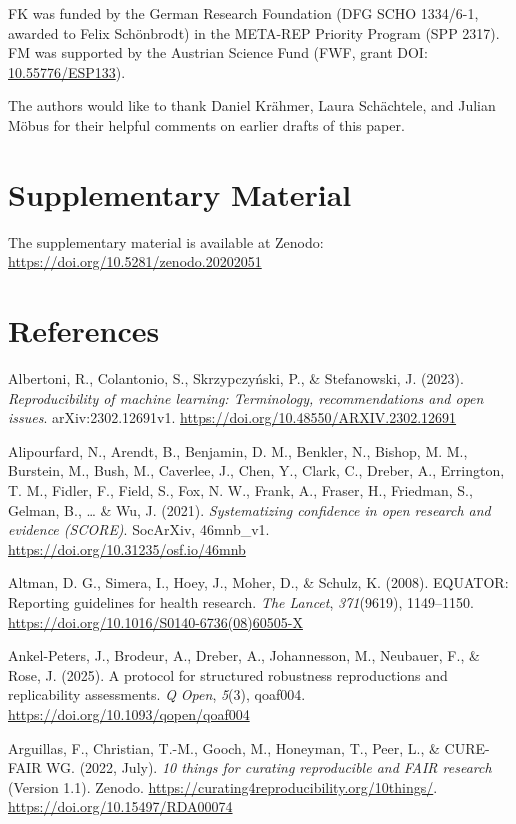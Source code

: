 \documentclass[authordate, meta]{jote-new-article}
\begin{document}
	FK was funded by the German Research Foundation (DFG SCHO 1334/6-1, awarded to Felix Schönbrodt) in the META-REP Priority Program (SPP 2317). FM was supported by the Austrian Science Fund (FWF, grant DOI: \href{https://doi.org/10.55776/ESP133}{10.55776/ESP133}).




	The authors would like to thank Daniel Krähmer, Laura Schächtele, and Julian Möbus for their helpful comments on earlier drafts of this paper.




	\section{Supplementary Material}



	The supplementary material is available at Zenodo: \url{https://doi.org/10.5281/zenodo.20202051}

	\section{References}

	Albertoni, R., Colantonio, S., Skrzypczyński, P., \& Stefanowski, J. (2023). \emph{Reproducibility of machine learning: Terminology, recommendations and open issues}. arXiv:2302.12691v1. \url{https://doi.org/10.48550/ARXIV.2302.12691}


	Alipourfard, N., Arendt, B., Benjamin, D. M., Benkler, N., Bishop, M. M., Burstein, M., Bush, M., Caverlee, J., Chen, Y., Clark, C., Dreber, A., Errington, T. M., Fidler, F., Field, S., Fox, N. W., Frank, A., Fraser, H., Friedman, S., Gelman, B., … \& Wu, J. (2021). \emph{Systematizing confidence in open research and evidence (SCORE)}. SocArXiv, 46mnb\_v1. \url{https://doi.org/10.31235/osf.io/46mnb}


	Altman, D. G., Simera, I., Hoey, J., Moher, D., \& Schulz, K. (2008). EQUATOR: Reporting guidelines for health research. \emph{The Lancet}, \emph{371}(9619), 1149--1150. \url{https://doi.org/10.1016/S0140-6736(08)60505-X}



	Ankel-Peters, J., Brodeur, A., Dreber, A., Johannesson, M., Neubauer, F., \& Rose, J. (2025). A protocol for structured robustness reproductions and replicability assessments. \emph{Q Open}, \emph{5}(3), qoaf004. \url{https://doi.org/10.1093/qopen/qoaf004}

	Arguillas, F., Christian, T.-M., Gooch, M., Honeyman, T., Peer, L., \& CURE-FAIR WG. (2022, July). \emph{10 things for curating reproducible and FAIR research} (Version 1.1). Zenodo. \url{https://curating4reproducibility.org/10things/}. \url{https://doi.org/10.15497/RDA00074}
\end{document}
